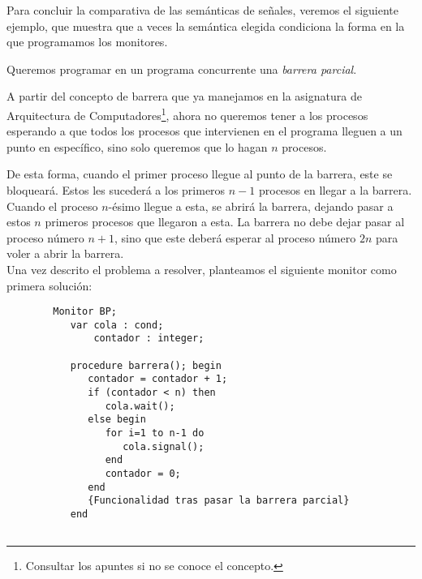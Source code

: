 Para concluir la comparativa de las semánticas de señales, veremos el siguiente ejemplo, que muestra que a veces la semántica elegida condiciona la forma en la que programamos los monitores.

\begin{ejemplo}
    Queremos programar en un programa concurrente una \textit{barrera parcial}.

    A partir del concepto de barrera que ya manejamos en la asignatura de Arquitectura de Computadores\footnote{Consultar los apuntes si no se conoce el concepto.}, ahora no queremos tener a los procesos esperando a que todos los procesos que intervienen en el programa lleguen a un punto en específico, sino solo queremos que lo hagan $n$ procesos.

    De esta forma, cuando el primer proceso llegue al punto de la barrera, este se bloqueará. Estos les sucederá a los primeros $n-1$ procesos en llegar a la barrera. Cuando el proceso $n$-ésimo llegue a esta, se abrirá la barrera, dejando pasar a estos $n$ primeros procesos que llegaron a esta. La barrera no debe dejar pasar al proceso número $n+1$, sino que este deberá esperar al proceso número $2n$ para voler a abrir la barrera.\\

    Una vez descrito el problema a resolver, planteamos el siguiente monitor como primera solución:
    \begin{verbatim}
        Monitor BP;
           var cola : cond;
               contador : integer;

           procedure barrera(); begin
              contador = contador + 1;
              if (contador < n) then
                 cola.wait();
              else begin
                 for i=1 to n-1 do
                    cola.signal();
                 end
                 contador = 0;
              end
              {Funcionalidad tras pasar la barrera parcial}
           end


\end{verbatim}
\end{ejemplo}
